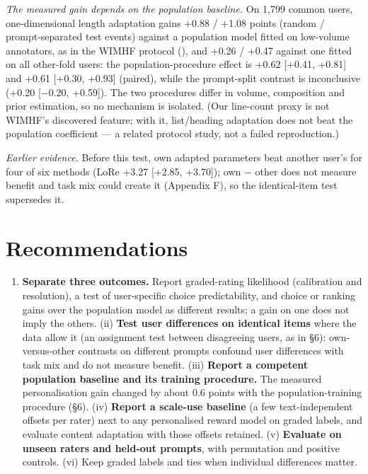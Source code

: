 \documentclass{article}
\newcommand{\tightlist}{\setlength{\itemsep}{0pt}\setlength{\parskip}{0pt}}
\begin{document}
\emph{The measured gain depends on the population baseline.} On 1,799 common users, one-dimensional length adaptation gains +0.88 / +1.08 points (random / prompt-separated test events) against a population model fitted on low-volume annotators, as in the WIMHF protocol (\citealp{movva2025wimhf}), and +0.26 / +0.47 against one fitted on all other-fold users: the population-procedure effect is +0.62 {[}+0.41, +0.81{]} and +0.61 {[}+0.30, +0.93{]} (paired), while the prompt-split contrast is inconclusive (+0.20 {[}$-$0.20, +0.59{]}). The two procedures differ in volume, composition and prior estimation, so no mechanism is isolated. (Our line-count proxy is not WIMHF's discovered feature; with it, list/heading adaptation does not beat the population coefficient --- a related protocol study, not a failed reproduction.)

\emph{Earlier evidence.} Before this test, own adapted parameters beat another user's for four of six methods (LoRe +3.27 {[}+2.85, +3.70{]}); own $-$ other does not measure benefit and task mix could create it (Appendix F), so the identical-item test supersedes it.

\section{Recommendations}

\begin{enumerate}
\def\labelenumi{(\roman{enumi})}
\tightlist
\item
  \textbf{Separate three outcomes.} Report graded-rating likelihood (calibration and resolution), a test of user-specific choice predictability, and choice or ranking gains over the population model as different results; a gain on one does not imply the others. (ii) \textbf{Test user differences on identical items} where the data allow it (an assignment test between disagreeing users, as in \S{}6): own-versus-other contrasts on different prompts confound user differences with task mix and do not measure benefit. (iii) \textbf{Report a competent population baseline and its training procedure.} The measured personalisation gain changed by about 0.6 points with the population-training procedure (\S{}6). (iv) \textbf{Report a scale-use baseline} (a few text-independent offsets per rater) next to any personalised reward model on graded labels, and evaluate content adaptation with those offsets retained. (v) \textbf{Evaluate on unseen raters and held-out prompts}, with permutation and positive controls. (vi) Keep graded labels and ties when individual differences matter.
\end{enumerate}
\end{document}
